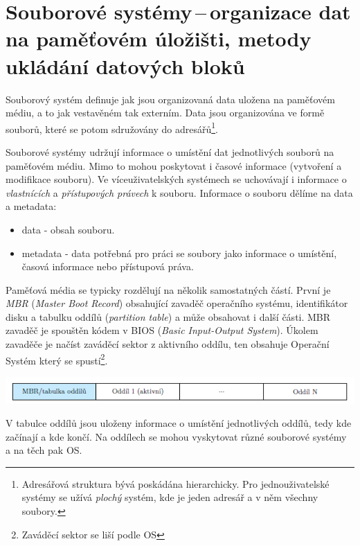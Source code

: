 
\newpage
\section{Souborové systémy\,--\,organizace dat na paměťovém úložišti, metody ukládání datových bloků}

Souborový systém definuje jak jsou organizovaná data uložena na paměťovém médiu, a to jak vestavěném tak externím. Data jsou organizována ve formě souborů, které se potom sdružovány do adresářů\footnote{Adresářová struktura bývá poskádána hierarchicky. Pro jednouživatelské systémy se užívá \textit{plochý} systém, kde je jeden adresář a v něm všechny soubory.}. 

\vspace{0,5cm}

Souborové systémy udržují informace o umístění dat jednotlivých souborů na paměťovém médiu. Mimo to mohou poskytovat i časové informace (vytvoření a modifikace souboru). Ve víceuživatelských systémech se uchovávají i informace o \textit{vlastnících} a \textit{přístupových právech} k souboru. Informace o souboru dělíme na data a metadata:
\begin{itemize}
    \item data - obsah souboru.
    \item metadata - data potřebná pro práci se soubory jako informace o umístění, časová informace nebo přístupová práva. 
\end{itemize}

Paměťová média se typicky rozdělují na několik samostatných částí. První je \textit{MBR} (\textit{Master Boot Record}) obsahující zavaděč operačního systému, identifikátor disku a tabulku oddílů (\textit{partition table}) a může obsahovat i další části. MBR zavaděč je spouštěn kódem v BIOS (\textit{Basic Input-Output System}). Úkolem zavaděče je načíst zaváděcí sektor z aktivního oddílu, ten obsahuje Operační Systém který se spustí\footnote{Zaváděcí sektor se liší podle OS}. 

\begin{center}
    \includegraphics[scale=1]{images/mem_partitions.png}
\end{center}

V tabulce oddílů jsou uloženy informace o umístění jednotlivých oddílů, tedy kde začínají a kde končí. Na oddílech se mohou vyskytovat různé souborové systémy a na těch pak OS.

